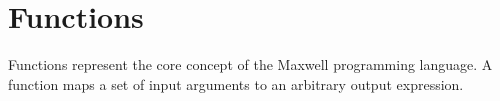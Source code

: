 \section{Functions}

Functions represent the core concept of the Maxwell programming language. A function maps a set of input arguments to an arbitrary output expression.



